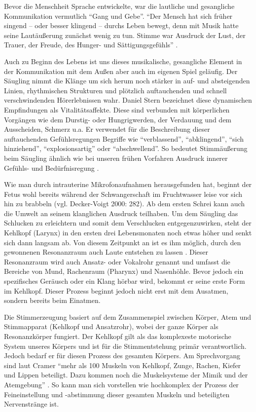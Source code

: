 Bevor die Menschheit Sprache entwickelte, war die lautliche und gesangliche Kommunikation vermutlich "`Gang und Gebe"'. "`Der Mensch hat sich früher singend – oder besser klingend – durchs Leben bewegt, denn mit Musik hatte seine Lautäußerung zunächst wenig zu tun. Stimme war Ausdruck der Lust, der Trauer, der Freude, des Hunger- und Sättigungsgefühls"' \autocite[8]{cramer1998}.

Auch zu Beginn des Lebens ist uns dieses musikalische, gesangliche Element in der Kommunikation mit dem Außen aber auch im eigenen Spiel geläufig. Der Säugling nimmt die Klänge um sich herum noch stärker in auf- und absteigenden Linien, rhythmischen Strukturen und plötzlich auftauchenden und schnell verschwindenden Hörerlebnissen wahr. Daniel Stern bezeichnet diese dynamischen Empfindungen als Vitalitätsaffekte. Diese sind verbunden mit körperlichen Vorgängen wie dem Durstig- oder Hungrigwerden, der Verdauung und dem Ausscheiden, Schmerz u.a. Er verwendet für die Beschreibung dieser auftauchenden Gefühlsregungen Begriffe wie "`verblassend"', "`abklingend"', "`sich hinziehend"', "`explosionsartig"' oder "`abschwellend"'.
So bedeutet Stimmäußerung beim Säugling ähnlich wie bei unseren frühen Vorfahren Ausdruck innerer Gefühls- und Bedürfnisregung \autocite[vgl.][83]{stern2007}. 

Wie man durch intrauterine Mikrofonaufnahmen herausgefunden hat, beginnt der Fetus wohl bereits während der Schwangerschaft im Fruchtwasser leise vor sich hin zu brabbeln (vgl. Decker-Voigt 2000: 282). Ab dem ersten Schrei kann auch die Umwelt an seinem klanglichen Ausdruck teilhaben. Um dem Säugling das Schlucken zu erleichtern und somit dem Verschlucken entgegenzuwirken, steht der Kehlkopf (Larynx) in den ersten drei Lebensmonaten noch etwas höher und senkt sich dann langsam ab. Von diesem Zeitpunkt an ist es ihm möglich, durch den gewonnenen Resonanzraum auch Laute entstehen zu lassen \autocite[vgl.][36]{cramer1998}. Dieser Resonanzraum wird auch Ansatz- oder Vokalrohr genannt und umfasst die Bereiche von Mund, Rachenraum (Pharynx) und Nasenhöhle. Bevor jedoch ein spezifisches Geräusch oder ein Klang hörbar wird, bekommt er seine erste Form im Kehlkopf. Dieser Prozess beginnt jedoch nicht erst mit dem Ausatmen, sondern bereits beim Einatmen. 

Die Stimmerzeugung basiert auf dem Zusammenspiel zwischen Körper, Atem und Stimmapparat (Kehlkopf und Ansatzrohr), wobei der ganze Körper als Resonanzkörper fungiert. Der Kehlkopf gilt als das komplexeste motorische System unseres Körpers und ist für die Stimmentstehung primär verantwortlich. Jedoch bedarf er für diesen Prozess des gesamten Körpers. Am Sprechvorgang sind laut Cramer "`mehr als 100 Muskeln von Kehlkopf, Zunge, Rachen, Kiefer und Lippen beteiligt. Dazu kommen noch die Muskelsysteme der Mimik und der Atemgebung"' \autocite[40]{cramer1998}. So kann man sich vorstellen wie hochkomplex der Prozess der Feineinstellung und -abstimmung dieser gesamten Muskeln und beteiligten Nervenstränge ist. 

